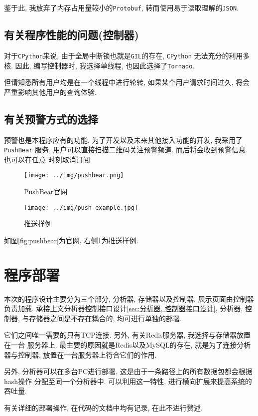 鉴于此, 我放弃了内存占用量较小的\texttt{Protobuf},
转而使用易于读取理解的\texttt{JSON}.

\section{有关程序性能的问题(控制器)}

  对于\texttt{CPython}来说, 由于全局中断锁也就是\texttt{GIL}的存在, \texttt{CPython}
无法充分的利用多核. 因此, 编写控制器时, 我选择单线程, 也因此选择了\texttt{Tornado}.

但请知悉所有用户均是在一个线程中进行轮转, 如果某个用户请求时间过久,
将会严重影响其他用户的查询体验.

\section{有关预警方式的选择}

  预警也是本程序应有的功能, 为了开发以及未来其他接入功能的开发, 我采用了\texttt{PushBear}
服务, 用户可以直接扫描二维码关注预警频道. 而后将会收到预警信息. 也可以在任意
时刻取消订阅.

\begin{figure}[htbp]


\centering
\begin{minipage}{0.76\textwidth}

    \texttt{[image: ../img/pushbear.png]}
    \caption{PushBear官网}
    \label{fig:pushbear}

\end{minipage} \hfill
\begin{minipage}{0.22\textwidth}

\centering
    \texttt{[image: ../img/push\_example.jpg]}
    \caption{推送样例}
    \label{fig:push_example}
\end{minipage}

\end{figure}

如图\ref{fig:pushbear}为官网, 右侧\ref{fig:push_example}为推送样例.



\chapter{程序部署}

  本次的程序设计主要分为三个部分, 分析器, 存储器以及控制器, 展示页面由控制器
负责加载. 承接上文分析器控制接口设计\ref{sec:分析器, 控制器接口设计}, 分析器, 
控制器, 与存储器之间是不存在耦合的, 均可进行单独的部署.

  它们之间唯一需要的只有TCP连接. 另外, 有关Redis服务器, 我选择与存储器放置在一台
服务器上. 最主要的原因就是Redis以及MySQL的存在, 就是为了连接分析器与控制器,
放置在一台服务器上符合它们的作用.

  另外, 分析器可以在多台PC进行部署, 这是由于一条路径上的所有数据包都会根据hash操作
分配至同一个分析器中. 可以利用这一特性, 进行横向扩展来提高系统的吞吐量.

  有关详细的部署操作, 在代码的文档中均有记录, 在此不进行赘述.




